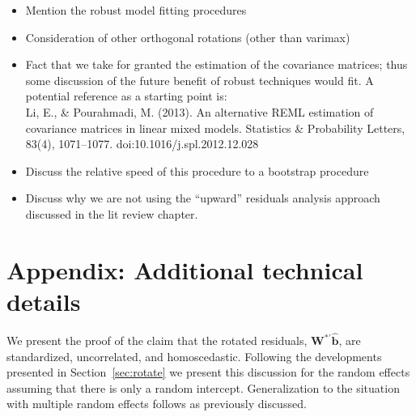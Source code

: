 \documentclass[12pt]{article} %
\begin{document}
\begin{itemize}
\item Mention the robust model fitting procedures
\item Consideration of other orthogonal rotations (other than varimax)
\item Fact that we take for granted the estimation of the covariance matrices; thus some discussion of the future benefit of robust techniques would fit. A potential reference as a starting point is:\\ Li, E., \& Pourahmadi, M. (2013). An alternative REML estimation of covariance matrices in linear mixed models. Statistics \& Probability Letters, 83(4), 1071--1077. doi:10.1016/j.spl.2012.12.028
\item Discuss the relative speed of this procedure to a bootstrap procedure
\item Discuss why we are not using the ``upward'' residuals analysis approach discussed in the lit review chapter.
\end{itemize}

\section*{Appendix: Additional technical details}

We present the proof of the claim that the rotated residuals, $\bm{W}^{*\prime} \widehat{\bm{b}}$, are standardized, uncorrelated, and homoscedastic. Following the developments presented in Section~\ref{sec:rotate} we present this discussion for the random effects assuming that there is only a random intercept. Generalization to the situation with multiple random effects follows as previously discussed.
\end{document}
